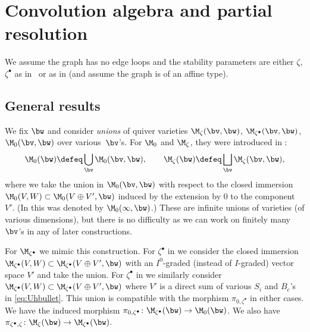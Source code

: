 \section{Convolution algebra and partial resolution}\label{sec:convolution}

We assume the graph has no edge loops and the stability parameters are
either $\zeta$, $\zeta^\bullet$ as in~ or as in
 (and assume the graph is of an af\/f\/ine type).

\subsection{General results}

We f\/ix $\bw$ and consider {\it unions\/} of quiver varieties
$\M_{\zeta}(\bv,\bw)$, $\M_{\zeta^\bullet}(\bv,\bw)$, $\M_0(\bv,\bw)$
over va\-rious~$\bv$'s.
%
For $\M_0$ and $\M_{\zeta}$, they were introduced in
\cite[Section~2.5]{Na-qaff}:
\begin{equation*}
   \M_{0}(\bw) \defeq \bigcup_{\bv} \M_{0}(\bv,\bw),\qquad
   \M_{\zeta}(\bw) \defeq \bigsqcup_{\bv} \M_{\zeta}(\bv,\bw),
\end{equation*}
where we take the union in $\M_0(\bv,\bw)$ with respect to the closed
immersion $\M_0(V,W)\subset\M_0(V\oplus V',\bw)$ induced by the
extension by $0$ to the component $V'$. (In \cite[Section~2.5]{Na-qaff}
this was denoted by $\M_0(\infty,\bw)$.) These are inf\/inite unions of
varieties (of various dimensions), but there is no dif\/f\/iculty as we
can work on f\/initely many $\bv$'s in any of later constructions.

For $\M_{\zeta^\bullet}$ we mimic this construction. For
$\zeta^\bullet$ in  we consider the closed
immersion $\M_{\zeta^\bullet}(V,W)\subset\M_{\zeta^\bullet}(V\oplus
V',\bw)$ with an $I^0$-graded (instead of $I$-graded) vector space
$V'$ and take the union. For $\zeta^\bullet$ in
 we similarly consider
$\M_{\zeta^\bullet}(V,W)\subset\M_{\zeta^\bullet}(V\oplus V',\bw)$
where $V'$ is a direct sum of various $S_i$ and $B_c$'s in
\eqref{eq:Uhbullet}.
This union is compatible with the morphism $\pi_{0,\zeta^\bullet}$ in
either cases. We have the induced morphism
$\pi_{0,\zeta^\bullet}\colon \M_{\zeta^\bullet}(\bw)\to \M_0(\bw)$. We
also have $\pi_{\zeta^\bullet,\zeta}\colon
\M_{\zeta}(\bw)\to\M_{\zeta^\bullet}(\bw)$.

